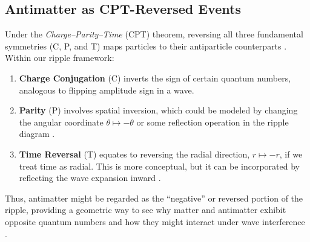 \documentclass{article}
\begin{document}
\subsection{Antimatter as CPT-Reversed Events}
\label{subsec:antimatter-cpt}
Under the \textit{Charge--Parity--Time} (CPT) theorem, reversing all three 
fundamental symmetries (C, P, and T) maps particles to their antiparticle 
counterparts \cite{rindler1977essential, misner1973}. Within our ripple framework:
\begin{enumerate}
  \item \textbf{Charge Conjugation} (C) 
    inverts the sign of certain quantum numbers, 
    analogous to flipping amplitude sign in a wave.
  \item \textbf{Parity} (P) 
    involves spatial inversion, which could be modeled by changing the 
    angular coordinate \(\theta \mapsto -\theta\) or some reflection operation 
    in the ripple diagram \cite{Bell1964, penrose2004}.
  \item \textbf{Time Reversal} (T) 
    equates to reversing the radial direction, \(r \mapsto -r\), if we treat 
    time as radial. This is more conceptual, but it can be incorporated by 
    reflecting the wave expansion inward \cite{feynmanlectures, rindler1977essential}.
\end{enumerate}
Thus, antimatter might be regarded as the ``negative'' or reversed 
portion of the ripple, providing a geometric way to see why matter 
and antimatter exhibit opposite quantum numbers and how they might 
interact under wave interference \cite{glauber1963}.
\end{document}
